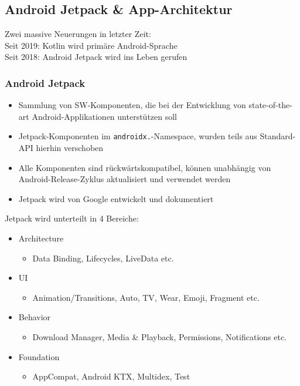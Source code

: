 \documentclass[a4paper]{article}
\begin{document}
		\subsection{Android Jetpack \& App-Architektur}
		
		Zwei massive Neuerungen in letzter Zeit:\\
		Seit 2019: Kotlin wird primäre Android-Sprache\\
		Seit 2018: Android Jetpack wird ins Leben gerufen
		
			\subsubsection{Android Jetpack}
			
			\begin{itemize}
				\item Sammlung von SW-Komponenten, die bei der Entwicklung von state-of-the-art Android-Applikationen unterstützen soll
				\item Jetpack-Komponenten im \texttt{androidx.}-Namespace, wurden teils aus Standard-API hierhin verschoben
				\item Alle Komponenten sind rückwärtskompatibel, können unabhängig von Android-Release-Zyklus aktualisiert und verwendet werden
				\item Jetpack wird von Google entwickelt und dokumentiert
			\end{itemize}
			\vspace{1em}
			Jetpack wird unterteilt in 4 Bereiche:
			\vspace{1em}
			\begin{itemize}
				\item Architecture
				\begin{itemize}
					\item Data Binding, Lifecycles, LiveData etc.
				\end{itemize}
				\item UI
				\begin{itemize}
					\item Animation/Transitions, Auto, TV, Wear, Emoji, Fragment etc.
				\end{itemize}
				\item Behavior
				\begin{itemize}
					\item Download Manager, Media \& Playback, Permissions, Notifications etc.
				\end{itemize}
				\item Foundation
				\begin{itemize}
					\item AppCompat, Android KTX, Multidex, Test
				\end{itemize}
			\end{itemize}
			
\end{document}
